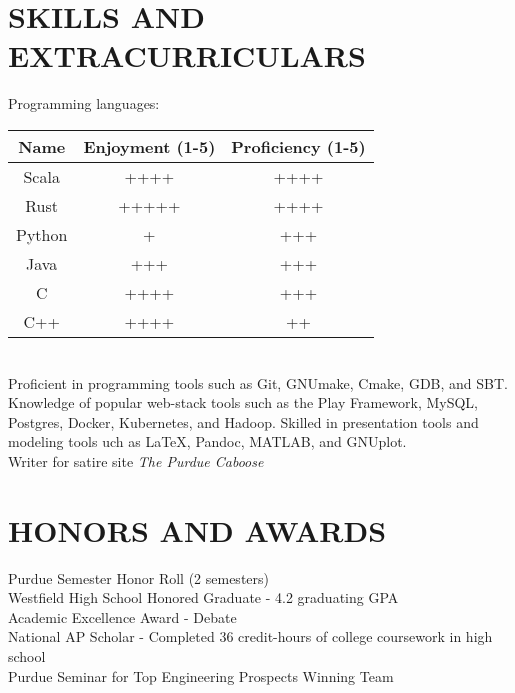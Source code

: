 \documentclass[10pt]{res}
\begin{document}
\begin{resume}
\vspace{-10pt}\section{SKILLS AND EXTRACURRICULARS}          
  Programming languages:\\
  \begin{tabular}{c | c | c}
    \hline
    Name & Enjoyment (1-5) & Proficiency (1-5) \\\hline
    Scala & ++++ & ++++ \\
    Rust & +++++ & ++++ \\
    Python & + & +++ \\
    Java & +++ & +++ \\
    C & ++++ & +++ \\
    C++ & ++++ & ++ \\
    \hline
  \end{tabular}\\
	Proficient in programming tools such as Git, GNUmake, Cmake, GDB, and SBT. \\
  Knowledge of popular web-stack tools such as the Play Framework, MySQL, Postgres, Docker, Kubernetes, and Hadoop.
	Skilled in presentation tools and modeling tools uch as \LaTeX, Pandoc, MATLAB, and GNUplot. \\
	Writer for satire site \emph{The Purdue Caboose}
 
\vspace{-10pt}\section{HONORS AND AWARDS}          
  Purdue Semester Honor Roll (2 semesters) \\
	Westfield High School Honored Graduate - 4.2 graduating GPA \\
	Academic Excellence Award - Debate \\
	National AP Scholar - Completed 36 credit-hours of college coursework in high school \\
  Purdue Seminar for Top Engineering Prospects Winning Team \\

\end{resume}
\end{document}
